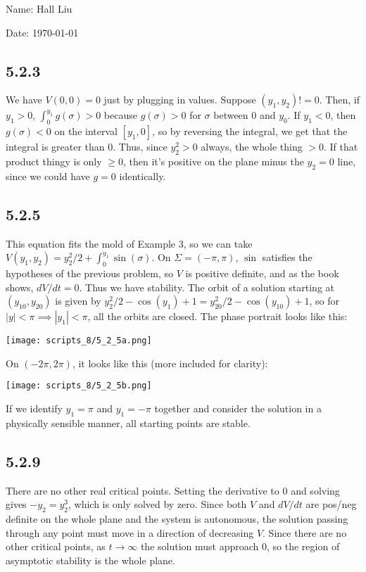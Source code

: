 \documentclass{article}
\begin{document}
Name: Hall Liu

Date: \today 
\vspace{1.5cm}

\subsection*{5.2.3}
We have $V(0,0)=0$ just by plugging in values. Suppose $(y_1,y_2)!=0$. Then, if $y_1>0$, $\int_0^{y_1}g(\sigma)>0$ because $g(\sigma)>0$ for $\sigma$ between $0$ and $y_0$. If $y_1<0$, then $g(\sigma)<0$ on the interval $[y_1,0]$, so by reversing the integral, we get that the integral is greater than $0$. Thus, since $y_2^2>0$ always, the whole thing $>0$. If that product thingy is only $\geq 0$, then it's positive on the plane minus the $y_2=0$ line, since we could have $g=0$ identically.
\subsection*{5.2.5}
This equation fits the mold of Example 3, so we can take $V(y_1,y_2)=y_2^2/2+\int_0^{y_1}\sin(\sigma)$. On $\Sigma=(-\pi,\pi)$, $\sin$ satisfies the hypotheses of the previous problem, so $V$ is positive definite, and as the book shows, $dV/dt=0$. Thus we have stability. The orbit of a solution starting at $(y_{10},y_{20})$ is given by $y_2^2/2-\cos(y_1)+1=y_{20}^2/2-\cos(y_{10})+1$, so for $|y|<\pi\implies|y_1|<\pi$, all the orbits are closed. The phase portrait looks like this:

\texttt{[image: scripts\_8/5\_2\_5a.png]}

On $(-2\pi,2\pi)$, it looks like this (more included for clarity):

\texttt{[image: scripts\_8/5\_2\_5b.png]}

If we identify $y_1=\pi$ and $y_1=-\pi$ together and consider the solution in a physically sensible manner, all starting points are stable. 

\subsection*{5.2.9}
There are no other real critical points. Setting the derivative to $0$ and solving gives $-y_2=y_2^3$, which is only solved by zero. Since both $V$ and $dV/dt$ are pos/neg definite on the whole plane and the system is autonomous, the solution passing through any point must move in a direction of decreasing $V$. Since there are no other critical points, as $t\to\infty$ the solution must approach $0$, so the region of asymptotic stability is the whole plane.
\end{document}
